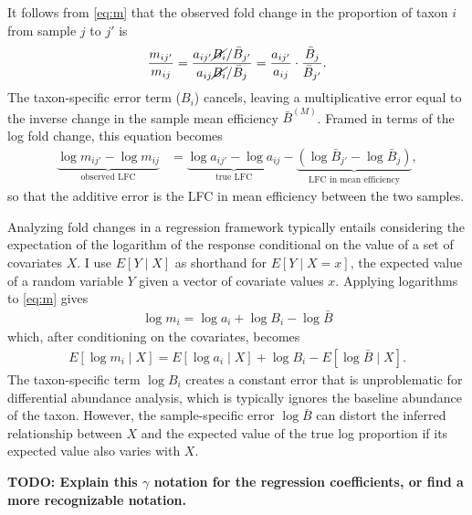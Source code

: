 \documentclass[
]{article}
\theoremstyle{definition}
\theoremstyle{definition}
\theoremstyle{definition}
\theoremstyle{definition}
\theoremstyle{remark}
\begin{document}
It follows from \eqref{eq:m} that the observed fold change in the proportion of taxon \(i\) from sample \(j\) to \(j'\) is
\begin{align}
  \label{eq:m-fc}
  \frac{m_{ij'}}{m_{ij}}
  = \frac{a_{ij'} \cancel{B_i} / \bar B_{j'}}{a_{ij} \cancel{B_i} / \bar B_{j}}
  = \frac{a_{ij'}}{a_{ij}} \cdot \frac{\bar B_j}{\bar B_{j'}}.
\end{align}
The taxon-specific error term (\(B_i\)) cancels, leaving a multiplicative error equal to the inverse change in the sample mean efficiency \(\bar B^{(M)}\).
Framed in terms of the log fold change, this equation becomes
\begin{align}
  \label{eq:m-lfc}
  \underbrace{ \log m_{ij'} - \log m_{ij} }_\text{observed LFC}
  &= \underbrace{ \log a_{ij'} - \log a_{ij} }_\text{true LFC}
  - \underbrace{ \left(\log \bar B_{j'} - \log \bar B_j\right) }_\text{LFC in mean efficiency},
\end{align}
so that the additive error is the LFC in mean efficiency between the two samples.

Analyzing fold changes in a regression framework typically entails considering the expectation of the logarithm of the response conditional on the value of a set of covariates \(X\).
I use \(E [Y \mid X]\) as shorthand for \(E [Y \mid X = x]\), the expected value of a random variable \(Y\) given a vector of covariate values \(x\).
Applying logarithms to \eqref{eq:m} gives
\begin{align}
  \label{eq:m-log}
  \log m_i = \log a_i + \log B_i - \log \bar B
\end{align}
which, after conditioning on the covariates, becomes
\begin{align}
  \label{eq:m-log-regression}
  E [\log m_i \mid X] 
  = E [\log a_i \mid X] + \log B_i - E [\log \bar B \mid X].
\end{align}
The taxon-specific term \(\log B_i\) creates a constant error that is unproblematic for differential abundance analysis, which is typically ignores the baseline abundance of the taxon.
However, the sample-specific error \(\log \bar B\) can distort the inferred relationship between \(X\) and the expected value of the true log proportion if its expected value also varies with \(X\).

\textbf{TODO: Explain this \(\gamma\) notation for the regression coefficients, or find a more recognizable notation.}
\end{document}
